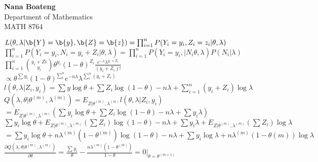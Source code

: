 \documentclass{article}\usepackage[]{graphicx}\usepackage[]{color}
\begin{document}

\begin{center}
{\Large {\bf Nana Boateng}} \\
\vspace{5mm}
{\Large Department of Mathematics} \\
\vspace{5mm}
{\Large MATH 8764} \\
\end{center}


$L(\theta,\lambda|\b{Y}=\b{y},\b{Z}=\b{z})=\prod_{i=1}^{n}P(Y_{i}=y_{i},Z_{i}=z_{i}|\theta,\lambda)$\\

$\prod_{i=1}^{n}P(Y_{i}=y_{i},N_{i}=y_{i}+Z_{i}|\theta,\lambda)=\prod_{i=1}^{n}P(Y_{i}=y_{i},|N_{i}\theta,\lambda)P(N_{i}|\lambda)$\\

$\prod_{i=1}^{n}\binom{y_{i}+Z{i}}{y_{i}}\theta^{y_{i}}(1-\theta)^{Z_{i}}\frac{e^{-\lambda}\lambda^{y_{i}+Z_{i}}}{(y_{i}+Z_{i})!}$\\

$\propto \theta^{\sum y_{i}}(1-\theta)^{\sum_{i}^{n}}e^{-n\lambda}\lambda^{\sum_{i}^{n}(y_{i}+Z_{i})}$\\

$l(\theta,\lambda|Z_{i},y_{i})=\sum y\log\theta+\sum Z_{i}\log(1-\theta)-n\lambda+\sum_{i=1}^{n}(y_{i}+Z_{i})\log \lambda$\\



$Q(\lambda,\theta|\theta^{(m)},\lambda^{(m)})=E_{Z|\theta^{(m)},\lambda^{(m)}}l(\theta,\lambda|Z_{i},y_{i})$\\

$=E_{Z|\theta^{(m)},\lambda^{(m)}} \left(\sum y_{i}\log\theta+ \sum Z_{i}\log(1-\theta)-n\lambda+\sum y_{i}\lambda \right)$\\

$\sum y_{i}\log \theta + E_{Z|\theta^{(m)},\lambda^{(m)}}(\sum Z_{i})\log (1-\theta)-n\lambda+\sum y_{i}\lambda +E_{Z|\theta^{(m)},\lambda^{(m)}}(\sum Z_{i})\log\lambda$\\

$=\sum y_{i}\log\theta+n\lambda^{(m)}(1-\theta^{(m)})\log(1-\theta)-n\lambda+\sum y_{i}\log \lambda+n\lambda^{(m)}(1-\theta{(m)})\log \lambda$\\

$\frac{\partial Q(\lambda,\theta|\theta^{(m)},\lambda^{(m)})}{\partial \theta}=\frac{\sum y_{i}}{\theta}-\frac{n\lambda^{(m)}(1-\theta^{(m)})}{1-\theta}=0|_{\theta=\theta^(m+1)}$\\
\end{document}
